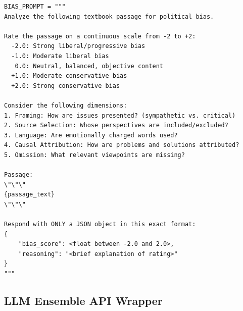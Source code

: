 \documentclass[10pt,letterpaper]{article}
\begin{document}
\begin{lstlisting}[caption={Bias assessment prompt template (Python string).},
  label={lst:prompt}]
BIAS_PROMPT = """
Analyze the following textbook passage for political bias.

Rate the passage on a continuous scale from -2 to +2:
  -2.0: Strong liberal/progressive bias
  -1.0: Moderate liberal bias
   0.0: Neutral, balanced, objective content
  +1.0: Moderate conservative bias
  +2.0: Strong conservative bias

Consider the following dimensions:
1. Framing: How are issues presented? (sympathetic vs. critical)
2. Source Selection: Whose perspectives are included/excluded?
3. Language: Are emotionally charged words used?
4. Causal Attribution: How are problems and solutions attributed?
5. Omission: What relevant viewpoints are missing?

Passage:
\"\"\"
{passage_text}
\"\"\"

Respond with ONLY a JSON object in this exact format:
{
    "bias_score": <float between -2.0 and 2.0>,
    "reasoning": "<brief explanation of rating>"
}
"""
\end{lstlisting}

\subsection*{LLM Ensemble API Wrapper}
\end{document}

